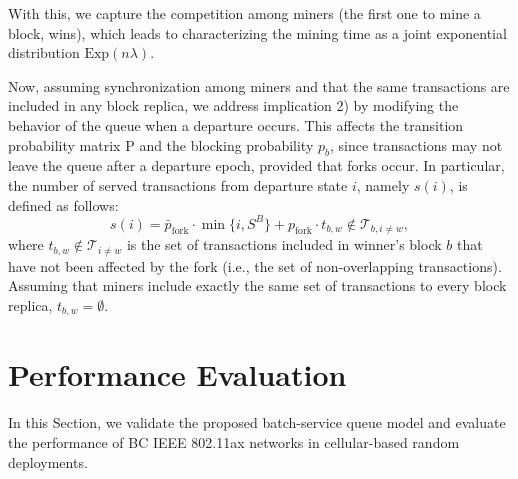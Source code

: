 \documentclass[conference]{IEEEtran}
\theoremstyle{definition}
\begin{document}
With this, we capture the competition among miners (the first one to mine a block, wins), which leads to characterizing the mining time as a joint exponential distribution $\text{Exp}(n\lambda)$.

Now, assuming synchronization among miners and that the same transactions are included in any block replica, we address implication 2) by modifying the behavior of the queue when a departure occurs. This affects the transition probability matrix $\text{P}$ and the blocking probability $p_b$, since transactions may not leave the queue after a departure epoch, provided that forks occur. In particular, the number of served transactions from departure state $i$, namely $s(i)$, is defined as follows:
\begin{equation}
    s(i) = \bar{p}_\text{fork}\cdot\min\{i,S^B\} + p_\text{fork}\cdot t_{b,w} \not\in \mathcal{T}_{b,i\neq w},
\end{equation}
where $t_{b,w} \not\in \mathcal{T}_{i\neq w}$ is the set of transactions included in winner's block $b$ that have not been affected by the fork (i.e., the set of non-overlapping transactions). Assuming that miners include exactly the same set of transactions to every block replica, $t_{b,w} = \emptyset$.

\section{Performance Evaluation}
\label{section:performance_evaluation}
In this Section, we validate the proposed batch-service queue model and evaluate the performance of BC IEEE 802.11ax networks in cellular-based random deployments.%


\end{document}

